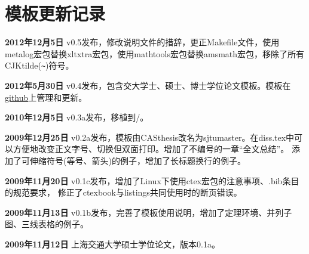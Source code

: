 
\chapter{模板更新记录}
\label{chap:updatelog}

\textbf{2012年12月5日} v0.5发布，修改说明文件的措辞，更正Makefile文件，使用metalog宏包替换xltxtra宏包，使用mathtools宏包替换amsmath宏包，移除了所有CJKtilde(\verb+~+)符号。

\textbf{2012年5月30日} v0.4发布，包含交大学士、硕士、博士学位论文模板。模板在\href{https://github.com/weijianwen/sjtu-thesis-template-latex}{github}上管理和更新。

\textbf{2010年12月5日} v0.3a发布，移植到\XeTeX/。

\textbf{2009年12月25日} v0.2a发布，模板由CASthesis改名为sjtumaster。在diss.tex中可以方便地改变正文字号、切换但双面打印。增加了不编号的一章“全文总结”。
添加了可伸缩符号(等号、箭头)的例子，增加了长标题换行的例子。

\textbf{2009年11月20日} v0.1c发布，增加了Linux下使用ctex宏包的注意事项、.bib条目的规范要求，
修正了ctexbook与listings共同使用时的断页错误。

\textbf{2009年11月13日} v0.1b发布，完善了模板使用说明，增加了定理环境、并列子图、三线表格的例子。

\textbf{2009年11月12日} 上海交通大学硕士学位论文，版本0.1a。

